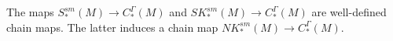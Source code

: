 \begin{lemma}\label{L: singular and cubical chain maps}
	The maps $S^{sm}_*(M) \to C_*^\Gamma(M)$ and $SK^{sm}_*(M) \to C_*^\Gamma(M)$ are well-defined chain maps.
	The latter induces a chain map $NK^{sm}_*(M) \to C_*^\Gamma(M)$.
\end{lemma}

